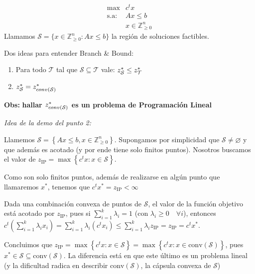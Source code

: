 \documentclass[10pt, aspectratio=169]{beamer}
\begin{document}
\begin{frame}{}
    \[
        \begin{array}{rl}
            \max & c^t x \\
             \text{s.a:}& Ax \leq b \\
              & x \in \mathbb{Z}^n_{\geq 0}
        \end{array}
    \]
    Llamamos $\mathcal{S}=\{x \in \mathbb{Z}^n_{\geq 0}\colon Ax \leq b\}$ la región de soluciones factibles.
    
    Dos ideas para entender Branch \& Bound:
    \begin{enumerate}
        \item Para todo $\mathcal{T}$ tal que $\mathcal{S}\subseteq \mathcal{T}$ vale:  $z^{\ast}_{\mathcal{S}} \leq z^{\ast}_{\mathcal{T}}$ 
        \item $z^{\ast}_{\mathcal{S}}= z^{\ast}_{conv(\mathcal{S})}$
    \end{enumerate}

    \textbf{Obs:} \textbf{hallar $z^{\ast}_{conv(\mathcal{S})}$ es un problema de Programación Lineal }
\end{frame}

\begin{frame}{}

    \textit{Idea de la demo del punto 2:}
    
	Llamemos $\mathcal{S} = \left \{ Ax \leq b, x \in \mathbb{Z}_{\geq 0}^n \right \}$. Supongamos por simplicidad que $\mathcal{S} \neq \varnothing$ y que adem\'as es acotado (y por ende tiene solo finitos puntos). Nosotros buscamos el valor de $z_{\text{IP}} = \max \left \{ c^tx : x \in \mathcal{S} \right \}$.
	
	 Como son solo finitos puntos, adem\'as de realizarse en alg\'un punto que llamaremos $x^*$, tenemos que $c^tx^* = z_{\text{IP}} < \infty$ 
	\pause
	
	 Dada una combinaci\'on convexa de puntos de $\mathcal{S}$, el valor de la funci\'on objetivo est\'a acotado por $z_{\text{IP}}$, pues si $\sum\limits_{i = 1}^k \lambda_i = 1$ (con $\lambda_i \geq 0 \quad \forall i$), entonces $c^t \left ( \sum\limits_{i = 1}^k \lambda_ix_i \right ) = \sum\limits_{i = 1}^k \lambda_i\left ( c^tx_i \right ) \leq \sum\limits_{i = 1}^k \lambda_iz_{\text{IP}} = z_{\text{IP}} = c^tx^*$.
	 \pause
	 
	 Concluimos que $z_{\text{IP}} = \max \left \{ c^tx : x \in \mathcal{S} \right \} = \max \left \{ c^tx : x \in \text{conv}(\mathcal{S}) \right \}$, pues $x^* \in \mathcal{S} \subseteq \text{conv}(\mathcal{S})$. La diferencia est\'a en que este \'ultimo es un problema lineal (y la dificultad radica en describir $\text{conv}(\mathcal{S})$, la c\'apsula convexa de  $\mathcal{S}$)
\end{frame}
\end{document}
